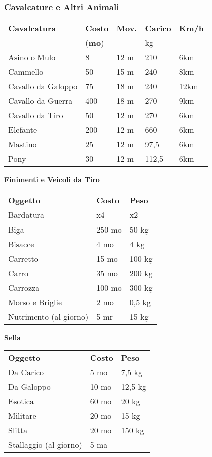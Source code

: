 \documentclass[12pt,a4paper,twoside,openany]{book}
\begin{document}
\begin{multicols}{2}
\subsubsection{Cavalcature e Altri Animali}


\begin{tabularx}{0.42\textwidth}{lllll}
\toprule
\textbf{Cavalcatura}&\textbf{Costo}&\textbf{Mov.}&\textbf{Carico}&\textbf{Km/h}\\
&(\textbf{mo})&&kg&\\
Asino o Mulo&8&12 m&210&6km\\
Cammello&50&15 m&240&8km\\
Cavallo da Galoppo&75&18 m&240&12km\\
Cavallo da Guerra&400&18 m&270&9km\\
Cavallo da Tiro&50&12 m&270&6km\\
Elefante&200&12 m&660&6km\\
Mastino&25&12 m&97,5&6km\\
Pony&30&12 m&112,5&6km\\
\end{tabularx}

\bigskip

\textbf{Finimenti e Veicoli da Tiro}\\
\begin{tabularx}{0.45\textwidth}{llX}
\toprule
\textbf{Oggetto}&\textbf{Costo}&\textbf{Peso}\\
Bardatura&x4&x2\\
Biga&250 mo&50 kg\\
Bisacce&4 mo&4 kg\\
Carretto&15 mo&100 kg\\
Carro&35 mo&200 kg\\
Carrozza&100 mo&300 kg\\
Morso e Briglie&2 mo&0,5 kg\\
Nutrimento (al giorno)&5 mr&15 kg\\
\end{tabularx}

\bigskip

\textbf{Sella}\\
\begin{tabularx}{0.45\textwidth}{llX}
\toprule
\textbf{Oggetto}&\textbf{Costo}&\textbf{Peso}\\
Da Carico&5 mo&7,5 kg\\
Da Galoppo&10 mo&12,5 kg\\
Esotica&60 mo&20 kg\\
Militare&20 mo&15 kg\\
Slitta&20 mo&150 kg\\
Stallaggio (al giorno)&5 ma&\\
\end{tabularx}


\end{multicols}
\end{document}
